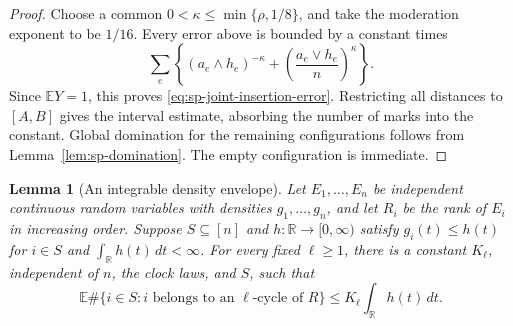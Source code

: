 \documentclass[11pt]{article}
\newtheorem{lemma}[theorem]{Lemma}
\theoremstyle{remark}
\theoremstyle{plain}
\newcommand{\E}{\mathbb E}
\newcommand{\R}{\mathbb R}
\begin{document}
\begin{proof}
Choose a common $0<\kappa\le\min\{\rho,1/8\}$, and take the moderation
exponent to be $1/16$.  Every error above is bounded by a constant times
\[
 \sum_e\left\{(a_e\wedge h_e)^{-\kappa}
 +\left(\frac{a_e\vee h_e}{n}\right)^\kappa\right\}.
\]
Since $\E Y=1$, this proves \eqref{eq:sp-joint-insertion-error}.
Restricting all distances to $[A,B]$ gives the interval estimate,
absorbing the number of marks into the constant.  Global domination for
the remaining configurations follows from Lemma~\ref{lem:sp-domination}.
The empty configuration is immediate.
\end{proof}


\begin{lemma}[An integrable density envelope]\label{lem:sp-density-envelope}
Let $E_1,\ldots,E_n$ be independent continuous random variables with
densities $g_1,\ldots,g_n$, and let $R_i$ be the rank of $E_i$ in increasing
order.  Suppose $S\subseteq[n]$ and $h:\R\to[0,\infty)$ satisfy
$g_i(t)\le h(t)$ for $i\in S$ and $\int_\R h(t)\,dt<\infty$.
For every fixed $\ell\ge1$, there is a constant $K_\ell$, independent of
$n$, the clock laws, and $S$, such that
\[
 \E\#\{i\in S:i\text{ belongs to an }\ell\text{-cycle of }R\}
 \le K_\ell\int_\R h(t)\,dt.
\]
\end{lemma}
\end{document}
